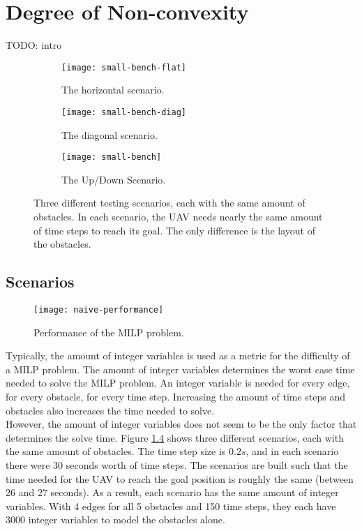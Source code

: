 \chapter{Degree of Non-convexity}
TODO: intro
\begin{figure}
	\centering
	\begin{subfigure}[t]{1\columnwidth}
        		\texttt{[image: small-bench-flat]}
        		\caption{The horizontal scenario.}
        		\label{fig:convex-straight}
	\end{subfigure}
	\par\bigskip
	\begin{subfigure}[t]{1\columnwidth}
        		\texttt{[image: small-bench-diag]}
        		\caption{The diagonal scenario.}
        		 \label{fig:convex-diag}
	\end{subfigure}	
	\par\bigskip
	\begin{subfigure}[t]{0.8\columnwidth}
        		\texttt{[image: small-bench]}
        		\caption{The Up/Down Scenario.}
        		 \label{fig:convex-full}
	\end{subfigure}	
    \caption{Three different testing scenarios, each with the same amount of obstacles. In each scenario, the UAV needs nearly the same amount of time steps to reach its goal. The only difference is the layout of the obstacles.}
    \label{fig:benchmarks}     
\end{figure}

\section{Scenarios}
\label{subsec:naive-scenarios}
\begin{figure}[]
	\centering
	\texttt{[image: naive-performance]}
	\caption{Performance of the MILP problem.}
	\label{fig:naive-performance}
\end{figure}
Typically, the amount of integer variables is used as a metric for the difficulty of a MILP problem. The amount of integer variables determines the worst case time needed to solve the MILP problem. An integer variable is needed for every edge, for every obstacle, for every time step. Increasing the amount of time steps and obstacles also increases the time needed to solve.\\
However, the amount of integer variables does not seem to be the only factor that determines the solve time. Figure \ref{fig:benchmarks} shows three different scenarios, each with the same amount of obstacles. The time step size is $0.2s$, and in each scenario there were 30 seconds worth of time steps. The scenarios are built such that the time needed for the UAV to reach the goal position is roughly the same (between 26 and 27 seconds). As a result, each scenario has the same amount of integer variables. With 4 edges for all 5 obstacles and 150 time steps, they each have 3000 integer variables to model the obstacles alone.\\

